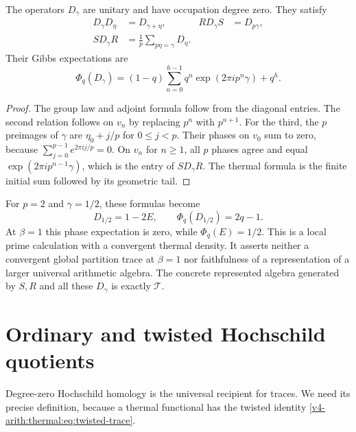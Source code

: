 \begin{proposition}
\label{v4-arith:thermal:prop:phase}
The operators $D_\gamma$ are unitary and have occupation degree zero.
They satisfy
\begin{align}
 D_\gamma D_\eta&=D_{\gamma+\eta},&
 RD_\gamma S&=D_{p\gamma},\\
 SD_\gamma R&=\frac1p\sum_{p\eta=\gamma}D_\eta.&
 \label{v4-arith:thermal:eq:phase-relations}
\end{align}
Their Gibbs expectations are
\begin{equation}
 \Phi_q(D_\gamma)
  =(1-q)\sum_{n=0}^{h-1}q^n\exp(2\pi i p^n\gamma)+q^h.
 \label{v4-arith:thermal:eq:phase-thermal}
\end{equation}
\end{proposition}

\begin{proof}
The group law and adjoint formula follow from the diagonal entries.
The second relation follows on $v_n$ by replacing $p^n$ with
$p^{n+1}$. For the third, the $p$ preimages of $\gamma$ are
$\eta_0+j/p$ for $0\leq j<p$. Their phases on $v_0$ sum to zero,
because $\sum_{j=0}^{p-1}e^{2\pi i j/p}=0$. On $v_n$ for $n\geq1$,
all $p$ phases agree and equal $\exp(2\pi i p^{n-1}\gamma)$,
which is the entry of $SD_\gamma R$. The thermal formula is the
finite initial sum followed by its geometric tail.
\end{proof}

For $p=2$ and $\gamma=1/2$, these formulas become
\[
 D_{1/2}=1-2E,
 \qquad \Phi_q(D_{1/2})=2q-1.
\]
At $\beta=1$ this phase expectation is zero, while
$\Phi_q(E)=1/2$. This is a local prime calculation with a convergent
thermal density. It asserts neither a convergent global partition
trace at $\beta=1$ nor faithfulness of a representation of a larger
universal arithmetic algebra. The concrete represented algebra
generated by $S,R$ and all these $D_\gamma$ is exactly $\mathcal T$.

\section{Ordinary and twisted Hochschild quotients}

Degree-zero Hochschild homology is the universal recipient for
traces. We need its precise definition, because a thermal functional
has the twisted identity \eqref{v4-arith:thermal:eq:twisted-trace}.

